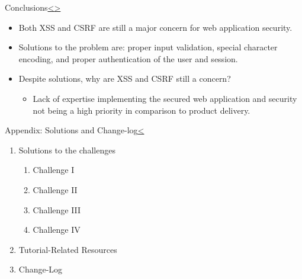 \documentclass[12pt]{extarticle}
\newenvironment{instructionblock}{\Large\bgroup}{\egroup}
\newcommand{\ben}{\begin{enumerate}}
\newcommand{\een}{\end{enumerate}}
\begin{document}


\pagebreak
\begin{slide}{Conclusions}{\hyperref[slide 20]{\textless}\hyperref[slide 22]{\textgreater}}
	\begin{instructionblock}
		\begin{itemize}
			\item Both XSS and CSRF are still a major concern for web application security.
			\item Solutions to the problem are: proper input validation, special character encoding, and proper authentication of the user and session. 
			\item Despite solutions, why are XSS and CSRF still a concern?
			\begin{itemize}
				\item Lack of expertise implementing the secured web application and security not being a high priority in comparison to product delivery.
			\end{itemize}
		\end{itemize}
	\end{instructionblock}	
\end{slide}






\pagebreak	
\begin{slide}{Appendix: Solutions and Change-log}{\hyperref[slide 21]{\textless}}
	\begin{instructionblock}
		\begin{enumerate}
			\item {Solutions to the challenges}
				\ben
					\item Challenge I
					\item Challenge II
					\item Challenge III
					\item Challenge IV
				\een
			\item {Tutorial-Related Resources}
			\item {Change-Log}
		\end{enumerate}
	\end{instructionblock}
\end{slide}
\end{document}
